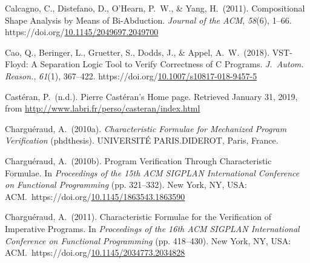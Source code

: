 \documentclass[12pt,twoside]{article}
\begin{document}
{\begin{thebibliography}{222}
Calcagno, C., Distefano, D., O’Hearn, P.~W., \& Yang, H.~(2011). Compositional Shape Analysis by Means of Bi-Abduction. \emph{Journal of the ACM}, \emph{58}(6), 1–66. https://doi.org/\href{https://dx.doi.org/10.1145/2049697.2049700}{10.1145/2049697.2049700}\label{calcagno_compositional_2011}%

Cao, Q., Beringer, L., Gruetter, S., Dodds, J., \& Appel, A.~W.~(2018). VST-Floyd: A Separation Logic Tool to Verify Correctness of C Programs. \emph{J.~Autom. Reason.}, \emph{61}(1), 367–422. https://doi.org/\href{https://dx.doi.org/10.1007/s10817-018-9457-5}{10.1007/s10817-018-9457-5}\label{cao_vst-floyd:_2018}%

\mdbibitemlabel{[Castéran, n.d.]}Castéran, P.~(n.d.). Pierre Castéran’s Home page. Retrieved January 31, 2019, from \href{http://www.labri.fr/perso/casteran/index.html}{{\ttfamily http://\hspace{0pt}www.\hspace{0pt}labri.\hspace{0pt}fr/\hspace{0pt}perso/\hspace{0pt}casteran/\hspace{0pt}index.\hspace{0pt}html}}\label{casteran_pierre_nodate}%

\mdbibitemlabel{[Charguéraud, 2010a]}Charguéraud, A.~(2010a). \emph{Characteristic Formulae for Mechanized Program Verification} (phdthesis). UNIVERSITÉ PARIS.DIDEROT, Paris, France.\label{chargueraud_characteristic_2010}%

\mdbibitemlabel{[Charguéraud, 2010b]}Charguéraud, A.~(2010b). Program Verification Through Characteristic Formulae. In \emph{Proceedings of the 15th ACM SIGPLAN International Conference on Functional Programming} (pp. 321–332). New York, NY, USA: ACM.~https://doi.org/\href{https://dx.doi.org/10.1145/1863543.1863590}{10.1145/1863543.1863590}\label{chargueraud_program_2010}%

\mdbibitemlabel{[Charguéraud, 2011]}Charguéraud, A.~(2011). Characteristic Formulae for the Verification of Imperative Programs. In \emph{Proceedings of the 16th ACM SIGPLAN International Conference on Functional Programming} (pp. 418–430). New York, NY, USA: ACM.~https://doi.org/\href{https://dx.doi.org/10.1145/2034773.2034828}{10.1145/2034773.2034828}\label{chargueraud_characteristic_2011}%


\end{thebibliography}}
\end{document}
